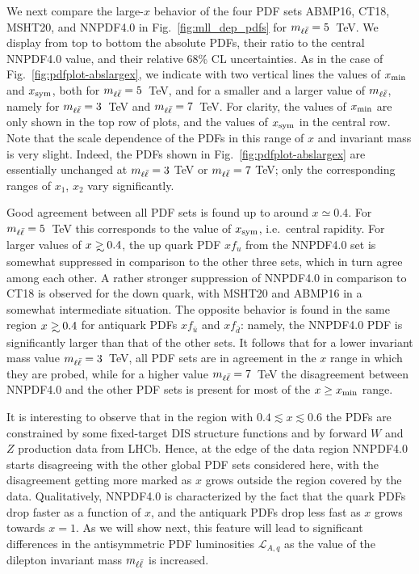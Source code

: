 We next compare the large-$x$ behavior 
of the four PDF sets ABMP16, CT18, MSHT20, and NNPDF4.0 in Fig.~\ref{fig:mll_dep_pdfs}
for $m_{\ell\bar{\ell}}=5$~TeV.
%
We display from top to bottom the absolute PDFs, their ratio to the central NNPDF4.0 value, and
their relative 68\% CL uncertainties.
%
As in the case of Fig.~\ref{fig:pdfplot-abslargex}, we indicate with two vertical lines
the values of $x_{\rm min}$ and $x_{\rm  sym}$,
both for $m_{\ell\bar{\ell}}=5$~TeV, and for a smaller and a larger value of $m_{\ell\bar{\ell}}$,
namely for $m_{\ell\bar{\ell}}=3$~TeV and  $m_{\ell\bar{\ell}}=7$~TeV.
%
For clarity, the values of $x_{\rm min}$ are only shown 
in the top row of plots, and the values of  $x_{\rm  sym}$ in the
central row. Note that the scale dependence
of the PDFs in this range of  $x$ and invariant mass is very
slight. Indeed, the PDFs shown in Fig.~\ref{fig:pdfplot-abslargex} are
essentially unchanged at $m_{\ell\bar{\ell}}=3$ TeV or  $m_{\ell\bar{\ell}}=7$ TeV;  only the
corresponding ranges of $x_1$, $x_2$ vary significantly.

Good agreement between all PDF
sets is found up to around $x\simeq 0.4$.
%
For $m_{\ell\bar{\ell}}=5$~TeV this corresponds to the value of $x_{\rm sym}$, i.e.\ central rapidity.
%
For larger values of $x\gsim 0.4$, the up  quark PDF $xf_u$ from the
NNPDF4.0 set is somewhat
suppressed in comparison to the other three sets, which in turn agree
among each other.
%
A rather stronger suppression of
NNPDF4.0  in comparison to  CT18 is observed for the down quark, with
MSHT20 and ABMP16 in a somewhat intermediate situation.
%
The opposite behavior is found in the same region $x\gsim 0.4$ for
antiquark PDFs  $xf_{\bar{u}}$ and $xf_{\bar{d}}$:
namely, the NNPDF4.0 PDF is significantly  larger than that of the other sets.
It follows that for a lower invariant mass value  $m_{\ell\bar{\ell}} = 3$~TeV, all
PDF sets are  in agreement in the $x$ range in which they are probed,
while for a higher value  $m_{\ell\bar{\ell}} = 7$~TeV the 
disagreement between NNPDF4.0 and the other PDF sets is present for
most of the $x\ge x_{\rm min}$ range.

It is interesting to observe that in the region with $0.4\lesssim x\lesssim 0.6$ the
PDFs are constrained by some fixed-target DIS structure functions and by
 forward $W$ and $Z$ production data from LHCb. Hence, at
the edge of the data region NNPDF4.0 starts disagreeing with the other
global PDF sets considered here, with the disagreement getting more
marked as $x$ grows outside the region covered by the
data.
%
Qualitatively, NNPDF4.0 is characterized by the fact that the
quark PDFs drop faster as a function of $x$, and the antiquark PDFs
drop less fast as $x$ grows towards $x=1$.
As we will show next, this feature will lead to significant differences
in the antisymmetric PDF luminosities $\mathcal{L}_{A,q}$ as the value of
the dilepton invariant mass $m_{\ell\bar{\ell}}$ is increased.

